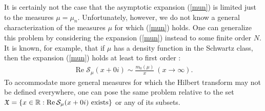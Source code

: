\documentclass[12pt]{article}
\begin{document}
It is certainly not the case that the asymptotic expansion (\ref{mun}) is limited just to the measures $\mu = \mu_n$.  %
 Unfortunately, however, we do not know a general characterization of the measures $\mu$  for which  (\ref{mun}) holds.  One can generalize this problem by considering the expansion (\ref{mun}) instead to some finite order $N$.  It is known, for example, that if $\mu$ has a density function in the Schwartz class, then the expansion (\ref{mun}) holds at least to first order \cite{tao}:
\begin{align*}
\operatorname{Re}{\mathcal S}_{\mu}(x+0i) \sim \frac{m_0(\mu)}{x} \ (x \to \infty).
\end{align*}
To accommodate more general measures for which the Hilbert transform may not be defined everywhere, one can pose the same problem relative to  the set ${\mathfrak X} = \{x \in {\mathbb R}: \operatorname{Re}{\mathcal S}_{\mu}(x+0i) \text{ exists}\}$ or any of its subsets.  


\end{document}
